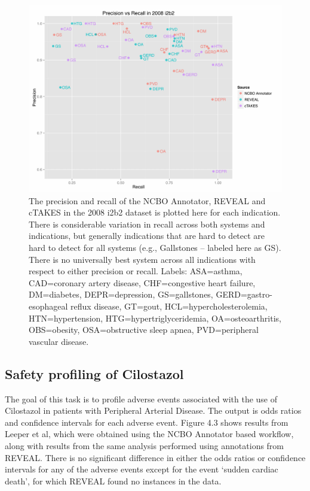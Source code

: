 \begin{figure}
  \begin{center}
    \includegraphics[width=0.9\linewidth]{ch4-figures/Figure2.pdf}
  \end{center}
  \caption[Performance of text processing methods in 2008 i2b2
    Challenge]{The precision and recall of the NCBO Annotator, REVEAL
    and cTAKES in the 2008 i2b2 dataset is plotted here for each
    indication.  There is considerable variation in recall across both
    systems and indications, but generally indications that are hard
    to detect are hard to detect for all systems (e.g., Gallstones –
    labeled here as GS).  There is no universally best system across
    all indications with respect to either precision or recall.
    Labels: ASA=asthma, CAD=coronary artery disease, CHF=congestive
    heart failure, DM=diabetes, DEPR=depression, GS=gallstones,
    GERD=gastro-esophageal reflux disease, GT=gout,
    HCL=hypercholesterolemia, HTN=hypertension,
    HTG=hypertriglyceridemia, OA=osteoarthritis, OBS=obesity,
    OSA=obstructive sleep apnea, PVD=peripheral vascular disease. }
  \label{fig:short}
\end{figure}


\subsection{Safety profiling of Cilostazol}
The goal of this task is to profile adverse events associated with the
use of Cilostazol in patients with Peripheral Arterial Disease.  The
output is odds ratios and confidence intervals for each adverse event.
Figure 4.3 shows results from Leeper et al, which were obtained using
the NCBO Annotator based workflow, along with results from the same
analysis performed using annotations from REVEAL.  There is no
significant difference in either the odds ratios or confidence
intervals for any of the adverse events except for the event ‘sudden
cardiac death’, for which REVEAL found no instances in the data.

